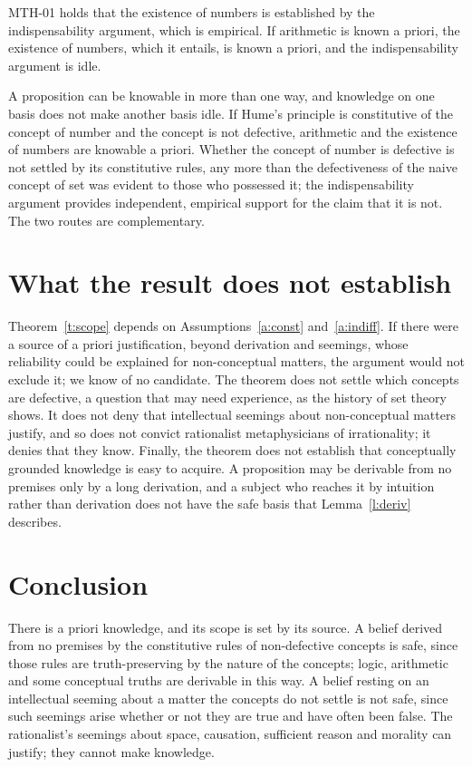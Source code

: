 \documentclass{situationist-preprint}
\begin{document}
\begin{objection}
MTH-01 holds that the existence of numbers is established by the indispensability argument, which is empirical. If arithmetic is known a priori, the existence of numbers, which it entails, is known a priori, and the indispensability argument is idle.
\end{objection}

\begin{reply}
A proposition can be knowable in more than one way, and knowledge on one basis does not make another basis idle. If Hume's principle is constitutive of the concept of number and the concept is not defective, arithmetic and the existence of numbers are knowable a priori. Whether the concept of number is defective is not settled by its constitutive rules, any more than the defectiveness of the naive concept of set was evident to those who possessed it; the indispensability argument provides independent, empirical support for the claim that it is not. The two routes are complementary.
\end{reply}

\section{What the result does not establish}

Theorem~\ref{t:scope} depends on Assumptions~\ref{a:const} and~\ref{a:indiff}. If there were a source of a priori justification, beyond derivation and seemings, whose reliability could be explained for non-conceptual matters, the argument would not exclude it; we know of no candidate. The theorem does not settle which concepts are defective, a question that may need experience, as the history of set theory shows. It does not deny that intellectual seemings about non-conceptual matters justify, and so does not convict rationalist metaphysicians of irrationality; it denies that they know. Finally, the theorem does not establish that conceptually grounded knowledge is easy to acquire. A proposition may be derivable from no premises only by a long derivation, and a subject who reaches it by intuition rather than derivation does not have the safe basis that Lemma~\ref{l:deriv} describes.

\section{Conclusion}

There is a priori knowledge, and its scope is set by its source. A belief derived from no premises by the constitutive rules of non-defective concepts is safe, since those rules are truth-preserving by the nature of the concepts; logic, arithmetic and some conceptual truths are derivable in this way. A belief resting on an intellectual seeming about a matter the concepts do not settle is not safe, since such seemings arise whether or not they are true and have often been false. The rationalist's seemings about space, causation, sufficient reason and morality can justify; they cannot make knowledge.
\end{document}
